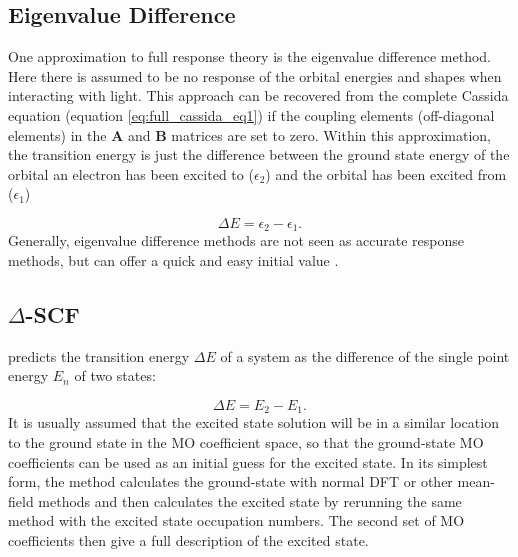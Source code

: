 \subsection{Eigenvalue Difference}
\label{subsec:eigval_diff}
One approximation to full response theory is the eigenvalue difference method. Here
there is assumed to be no response of the orbital energies and shapes when interacting
with light. This approach can be recovered from the complete Cassida equation (equation 
\ref{eq:full_cassida_eq1}) if the coupling elements (off-diagonal elements) in the
$\mathbf{A}$ and $\mathbf{B}$ matrices are set to zero. Within this approximation,
the transition energy is just the difference between the ground state energy of 
the orbital an electron has been excited to ($\epsilon_{\text{2}}$) and the orbital 
has been excited from ($\epsilon_{\text{1}}$)

\begin{equation}
\Delta E = \epsilon_{\text{2}} - \epsilon_{\text{1}}.
\end{equation}
%
Generally, eigenvalue difference methods are not seen as accurate response methods,
but can offer a quick and easy initial value \cite{Gimon2009}.

\subsection{$\Delta$-SCF}
\label{subsec{dscf_and_eigdiff}}

\dscf \cite{Jones1989, Hellman2004} predicts the transition energy $\Delta E$ of 
a system as the difference of the single point energy $E_n$ of two states:

\begin{equation}
\Delta E = E_{2} - E_{1}.
\end{equation}
%
It is usually assumed that the excited state solution will be in a similar location
to the ground state in the MO coefficient space, so that the ground-state MO coefficients
can be used as an initial guess for the excited state. In its simplest form, the
\dscf method calculates the ground-state with normal DFT or other mean-field methods
and then calculates the excited state by rerunning the same method with the excited
state occupation numbers. The second set of MO coefficients then give a full description
of the excited state.

